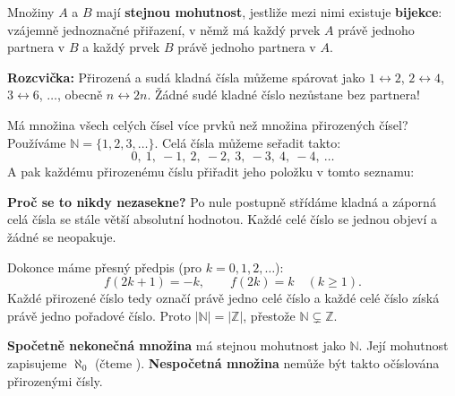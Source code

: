 \documentclass[11pt,a4paper]{article}
\begin{document}
\begin{definiceBox}[title={Definice - Stejná mohutnost množin}]
Množiny $A$ a $B$ mají \textbf{stejnou mohutnost}, jestliže mezi nimi
existuje \textbf{bijekce}: vzájemně jednoznačné přiřazení, v němž má každý
prvek $A$ právě jednoho partnera v $B$ a každý prvek $B$ právě jednoho
partnera v $A$.
\end{definiceBox}

\textbf{Rozcvička:} Přirozená a sudá kladná čísla můžeme spárovat jako
$1\leftrightarrow2$, $2\leftrightarrow4$, $3\leftrightarrow6$, $\ldots$,
obecně $n\leftrightarrow2n$. Žádné sudé kladné číslo nezůstane bez partnera!

\begin{prikladReseniBox}[title={Příklad 5}]
Má množina všech celých čísel více prvků než množina přirozených čísel?
Používáme $\mathbb N=\{1,2,3,\ldots\}$.
\tcblower
Celá čísla můžeme seřadit takto:
\[
\boxed{0,\ 1,\ -1,\ 2,\ -2,\ 3,\ -3,\ 4,\ -4,\ \ldots}
\]
A pak každému přirozenému číslu přiřadit jeho položku v tomto seznamu:
\begin{center}
\end{center}
\textbf{Proč se to nikdy nezasekne?} Po nule postupně střídáme
kladná a záporná celá čísla se stále větší absolutní hodnotou.
Každé celé číslo se jednou objeví a žádné se neopakuje.

Dokonce máme přesný předpis (pro $k=0,1,2,\ldots$):
\[
f(2k+1)=-k,\qquad f(2k)=k\quad (k\ge1).
\]
Každé přirozené číslo tedy označí právě jedno celé číslo a
každé celé číslo získá právě jedno pořadové číslo.
Proto \textbf{$|\mathbb N|=|\mathbb Z|$}, přestože $\mathbb N\subsetneq\mathbb Z$.
\end{prikladReseniBox}


\begin{definiceBox}[title={Definice - Spočetná a nespočetná množina}]
\textbf{Spočetně nekonečná množina} má stejnou mohutnost jako
$\mathbb N$. Její mohutnost zapisujeme $\aleph_0$ (čteme
). \textbf{Nespočetná množina} nemůže být takto očíslována
přirozenými čísly.
\end{definiceBox}
\end{document}
